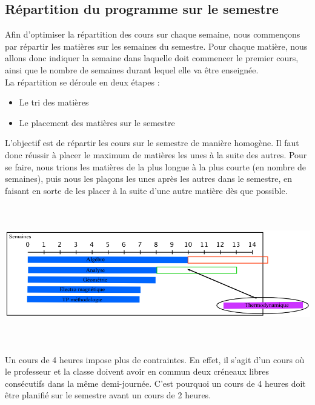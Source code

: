 \documentclass[12pt,a4paper,french]{article}
\begin{document}
\subsection{Répartition du programme sur le semestre}

Afin d'optimiser la répartition des cours sur chaque semaine, nous commençons par répartir les matières sur les semaines du semestre. Pour chaque matière, nous allons donc indiquer la semaine dans laquelle doit commencer le premier cours, ainsi que le nombre de semaines durant lequel elle va être enseignée.\\

La répartition se déroule en deux étapes : 
\begin{itemize}
\item Le tri des matières 
\item Le placement des matières sur le semestre\\
\end{itemize}

L'objectif est de répartir les cours sur le semestre de manière homogène. Il faut donc réussir à placer le maximum de matières les unes à la suite des autres. Pour se faire, nous trions les matières de la plus longue à la plus courte (en nombre de semaines), puis nous les plaçons les unes après les autres dans le semestre, en faisant en sorte de les placer à la suite d'une autre matière dès que possible.

\begin{center}
\includegraphics [width=160mm, height=60mm]{RepartitionSemestre2.png}
\end{center}

Un cours de 4 heures impose plus de contraintes. En effet, il s'agit d'un cours où le professeur et la classe doivent avoir en commun deux créneaux libres consécutifs dans la même demi-journée. C'est pourquoi un cours de 4 heures doit être planifié sur le semestre avant un cours de 2 heures.\\
\end{document}
